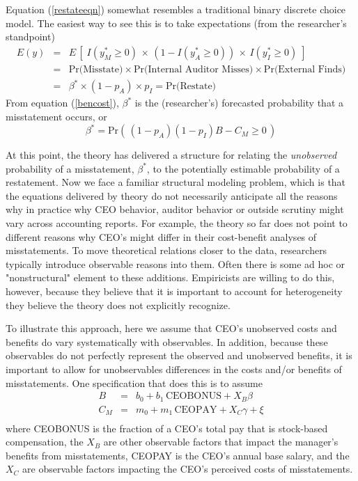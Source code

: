 Equation (\ref{restateeqn}) somewhat resembles a traditional binary discrete choice model. The easiest
way to see this is to take expectations (from the researcher's standpoint)
\begin{equation} \label{equilpr}
\begin{array}{lcl}
 E(y) & = & E\, \left[\; I(y^*_M \ge 0) \, \times\, (1 - I(y^*_A \ge 0)) \, \times\, I(y^*_I \ge 0) \; \right]\\[1em]
 & = &  \mbox{Pr(Misstate)} \times \mbox{Pr(Internal Auditor Misses)} \times
\mbox{Pr(External Finds)}\\[1em]
& = & \beta^* \times (1-p_A) \times p_{I} = \mbox{Pr(Restate)}
\end{array}\end{equation}
From equation (\ref{bencost}), $\beta^*$ is the (researcher's) forecasted probability that a misstatement occurs, or
\begin{equation}\label{betaplus}
\beta^*= \mbox{Pr}\left(\, (1 - p_A)(1 - p_I) B - C_M \ge 0 \,\right)
\end{equation}

At this point, the theory has delivered a structure for relating the {\it unobserved} 
probability of a misstatement, $\beta^*$, to the potentially estimable probability of
a restatement. Now we face a familiar structural modeling problem, which is that 
the equations delivered by theory do not necessarily anticipate all the reasons why
in practice why CEO behavior, auditor behavior or outside scrutiny might vary across 
accounting reports. For example, the theory so far does not point to different 
reasons why CEO's might differ in their cost-benefit analyses of misstatements. 
To move theoretical relations closer to the data, researchers typically introduce observable 
reasons into them. Often there is some ad hoc or "nonstructural" element to these
additions. Empiricists are willing to do this, however, because they believe that 
it is important to account for heterogeneity they believe the theory does not
explicitly recognize.

To illustrate this approach, here we assume that CEO's unobserved costs and benefits
do vary systematically with observables. In addition, because these observables do not
perfectly represent the observed and unobserved benefits, it is important to allow
for unobservables differences in the costs and/or benefits of misstatements. 
One specification that does this is to assume
\begin{equation}\begin{array}{lcl}\label{eqns1}
B & = & b_0 + b_1 \, \mbox{CEOBONUS} + X_B\beta\\[.5em]
C_M & = & m_0 + m_1 \, \mbox{CEOPAY} + X_C\gamma + \xi\\[.5em]
\end{array}
\end{equation}
where CEOBONUS is the fraction of a CEO's total pay that is stock-based compensation, 
the $X_B$ are other observable factors that impact the manager's benefits from misstatements,
CEOPAY is the CEO's annual base salary,  and the $X_C$ are observable factors impacting 
the CEO's perceived costs of misstatements.

